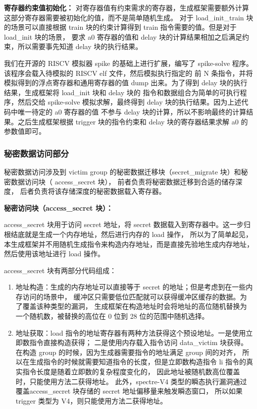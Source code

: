 \textbf{寄存器约束值初始化：}
对寄存器值有约束需求的寄存器，生成框架需要额外计算这部分寄存器需要被初始化的值，而不是简单随机生成。
对于 load\_init\_train 块的场景可以直接根据 train 块的约束计算得到 train 指令需要的值。但是对于 load\_init 块的场景，
要求 a0 寄存器的值和 delay 块的计算结果相加之后满足约束，所以需要事先知道 delay 块的执行结果。\par

我们在开源的 RISCV 模拟器 spike 的基础上进行扩展，编写了 spike-solve 程序。该程序会载入待模拟的 RISCV elf 文件，然后模拟执行指定的
前 N 条指令，并将模拟得到的浮点寄存器和通用寄存器的值 dump 出来。为了得到 delay 块的执行结果，生成框架将 load\_init 块和 delay 块的
指令和数据组合为简单的可执行程序，然后交给 spike-solve 模拟求解，最终得到 delay 块的执行结果。因为上述代码中唯一待定的 a0 寄存器的值
不参与 delay 块的计算，所以不影响最终的计算结果。之后生成框架根据 trigger 块的指令约束和 delay 块的寄存器结果求解 a0 的参数值即可。

\subsubsection{秘密数据访问部分}

秘密数据访问涉及到 victim group 的秘密数据迁移块（secret\_migrate 块）和秘密数据访问块（ access\_secret 块），
前者负责将秘密数据迁移到合适的储存深度，
后者负责将该存储深度的秘密数据载入寄存器。\par

\textbf{秘密访问块（access\_secret 块）：}\par
access\_secret 块用于访问 secret 地址，将 secret 数据载入到寄存器中。这一步归根结底就是生成一个内存地址，然后进行内存的 load 操作，
所以为了简单起见，本生成框架并不用随机生成指令来构造内存地址，而是直接先验地生成内存地址，然后使用该地址进行 load 操作。\par

access\_secret 块有两部分代码组成：
\begin{enumerate}
    \item 地址构造：生成的内存地址可以直接等于 secret 的地址；但是考虑到在一些内存访问的场景中，
缓冲区只需要低位匹配就可以获得缓冲区缓存的数据。为了覆盖该种类型的漏洞，
生成框架在构造地址时会将地址的高位随机替换为一个随机数，被替换的高位在 0 位到 28 位的范围中随机选择。\par
    \item 地址获取：load 指令的地址寄存器有两种方法获得这个预设地址。一是使用立即数指令直接构造获得；
二是使用内存载入指令访问 data\_victim 块获得。在构造 group 的时候，因为生成器需要指令的地址满足 group 间的对齐，
所以在生成指令的时候就需要知道指令的长度，但是立即数构造指令 li 指令的真实指令长度是随着立即数的复杂程度变化的，
因此地址被随机数高位覆盖时，只能使用方法二获得地址。
此外，spectre-V4 类型的瞬态执行漏洞通过覆盖access\_secret 块存储的 secret 地址偏移量来触发瞬态窗口，
所以如果 trigger 类型为 V4，则只能使用方法二获得地址。\par
\end{enumerate}

